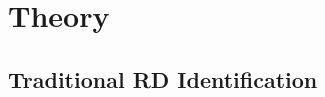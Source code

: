 \documentclass[12pt]{article}
\begin{document}

\section{Theory}

\subsection{Traditional RD Identification}
\end{document}
